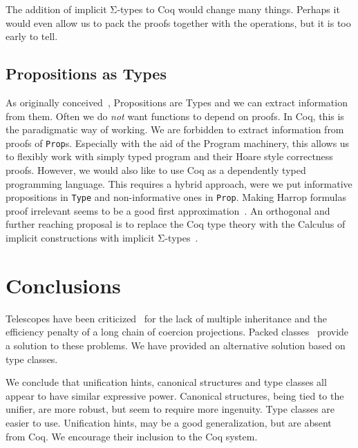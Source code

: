 \documentclass[a4paper,10pt,runningheads]{llncs}
\begin{document}
The addition of implicit Σ-types to Coq would change many things. Perhaps it would even allow us
to pack the proofs together with the operations, but it is too early to tell.

\subsection{Propositions as Types}
As originally conceived~\cite{ITT,CMCP}, Propositions are Types and we can extract information from
them. Often we do \emph{not} want functions to depend on proofs. In Coq, this is the paradigmatic way of working. We are forbidden to extract information from proofs of \lstinline|Prop|s. Especially with the aid of the Program machinery, this allows us to flexibly work with simply typed program and their Hoare style correctness proofs. However, we would also like to use Coq as a dependently typed programming language. This requires a hybrid approach, were we put informative propositions in \lstinline|Type| and non-informative ones in \lstinline|Prop|. Making Harrop formulas proof irrelevant seems to be a good first approximation~\cite{lcf:spi:03}. An orthogonal and further reaching proposal is to replace the Coq type theory with the Calculus of implicit constructions with implicit
Σ-types~\cite{miquel2001implicit,barras2008implicit,Bernardo}. 


\section{Conclusions}
Telescopes have been criticized~\cite{Packed} for the lack of multiple inheritance and
the efficiency penalty of a long chain of coercion projections. Packed classes~\cite{Packed} provide
a solution to these problems. We have provided an alternative solution based on type classes. 

We conclude that unification hints, canonical structures and type classes all appear to have
similar expressive power. Canonical structures, being tied to the unifier, are more robust, but
seem to require more ingenuity. Type classes are easier to use. Unification hints, may be a
good generalization, but are absent from Coq. We encourage their inclusion to the
Coq system.
\end{document}
